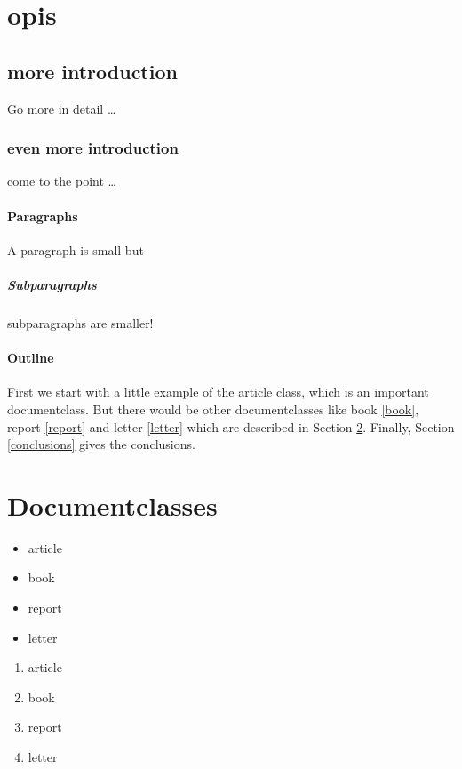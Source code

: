
\section{opis}

	
	\subsection{more introduction}
	Go more in detail \ldots
	
	\subsubsection{even more introduction}
	come to the point \ldots
	
	\paragraph{Paragraphs}
	A paragraph is small but 
	
	\subparagraph{Subparagraphs}
	subparagraphs are smaller! 
	
	\paragraph{Outline}
	First we start with a little example of the article class, which is an 
	important documentclass. But there would be other documentclasses like 
	book \ref{book}, report \ref{report} and letter \ref{letter} which are 
	described in Section \ref{documentclasses}. Finally, Section 
	\ref{conclusions} gives the conclusions.
	
	
	
	\section{Documentclasses} \label{documentclasses}
	
	\begin{itemize}
		\item article
		\item book 
		\item report 
		\item letter 
	\end{itemize}
	
	
	\begin{enumerate}
		\item article
		\item book 
		\item report 
		\item letter 
	\end{enumerate}
	
